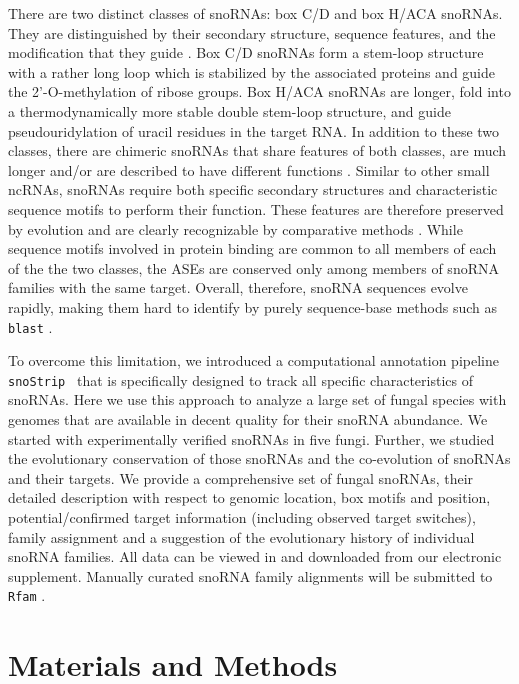 \documentclass[preprint,3p,times,twocolumn]{elsarticle}
\newcommand{\SB}[1]{\begingroup\color{turquoise}#1\endgroup}
\newcommand{\snostrip}{\texttt{snoStrip}}
\begin{document}
There are two distinct classes of snoRNAs: box C/D and box H/ACA
snoRNAs.  They are distinguished by their secondary structure,
sequence features, and the modification that they guide
\cite{Balakin:1996,Tollervey:1997}.  Box C/D snoRNAs form a stem-loop
structure with a rather long loop which is stabilized by the
associated proteins and guide the 2'-O-methylation of ribose groups.
Box H/ACA snoRNAs are longer, fold into a thermodynamically more
stable double stem-loop structure, and guide pseudouridylation of
uracil residues in the target RNA.  In addition to these two classes,
there are chimeric snoRNAs that share features of both classes, are
much longer and/or are described to have different functions
\cite{Darzacq:2002}. Similar to other small ncRNAs, snoRNAs require
both specific secondary structures and characteristic sequence motifs
to perform their function. These features are therefore preserved by
evolution and are clearly recognizable by comparative methods
\cite{Ganot:1997,Tollervey:1997}. While sequence motifs involved in
protein binding are common to all members of each of the the two
classes, the ASEs are conserved only among members of snoRNA families
with the same target. Overall, therefore, snoRNA sequences evolve
rapidly, making them hard to identify by purely sequence-base methods
such as \texttt{blast} \cite{Altschul:1990}.

To overcome this limitation, we introduced a computational annotation
pipeline \snostrip\ \cite{Bartschat:2014} that is specifically
designed to track all specific characteristics of snoRNAs. Here we use
this approach to analyze a large set of fungal species with genomes
that are available in decent quality for their snoRNA abundance.  We
started with experimentally verified snoRNAs in five fungi.  Further,
we studied the evolutionary conservation of those snoRNAs and the
co-evolution of snoRNAs and their targets. We provide a comprehensive
set of fungal snoRNAs, their detailed description with respect to
genomic location, box motifs and position, potential/confirmed target
information (including observed target switches), family assignment
and a suggestion of the evolutionary history of individual snoRNA
families.  All data can be viewed in and downloaded from our
electronic supplement. \SB{Manually curated snoRNA family alignments will
be submitted to \texttt{Rfam} \cite{Nawrocki:2015}.}


\section{Materials and Methods}
\end{document}
